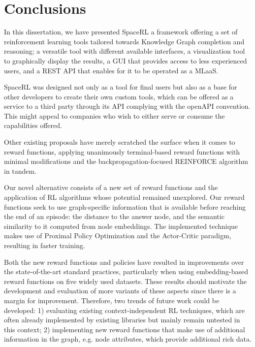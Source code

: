\chapter{Conclusions}\label{chap:conclusions}


\vspace{1cm}

In this dissertation, we have presented SpaceRL a framework offering a set of reinforcement learning tools tailored towards Knowledge Graph completion and reasoning; a versatile tool with different available interfaces, a visualization tool to graphically display the results, a GUI  that provides access to less experienced users, and a REST API that enables for it to be operated as a MLaaS.

SpaceRL was designed not only as a tool for final users but also as a base for other developers to create their own custom tools, which can be offered as a service to a third party through its API complying with the openAPI convention. This might appeal to companies who wish to either serve or consume the capabilities offered.

Other existing proposals have merely scratched the surface when it comes to reward functions, applying unanimously terminal-based reward functions with minimal modifications and the backpropagation-focused REINFORCE algorithm in tandem.

Our novel alternative consists of a new set of reward functions and the application of RL algorithms whose potential remained unexplored. Our reward functions seek to use graph-specific information that is available before reaching the end of an episode: the distance to the answer node, and the semantic similarity to it computed from node embeddings. The implemented technique makes use of Proximal Policy Optimization and the Actor-Critic paradigm, resulting in faster training.

Both the new reward functions and policies have resulted in improvements over the state-of-the-art standard practices, particularly when using embedding-based reward functions on five widely used datasets. These results should motivate the development and evaluation of more variants of these aspects since there is a margin for improvement. Therefore, two trends of future work could be developed: 1) evaluating existing context-independent RL techniques, which are often already implemented by existing libraries but mainly remain untested in this context; 2) implementing new reward functions that make use of additional information in the graph, e.g. node attributes, which provide additional rich data.